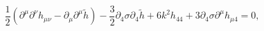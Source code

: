 \begin{equation}\label{4-4}
\frac{1}{2}(\partial^\mu \partial^\nu  h_{\mu\nu} - \partial_\mu
\partial^\mu \tilde h ) - \frac{3}{2}\partial_4 \sigma \partial_4 \tilde h
+ 6 k^2 h_{44} +3\partial_4\sigma\partial^{\mu}h_{\mu 4}=0,
\end{equation}

